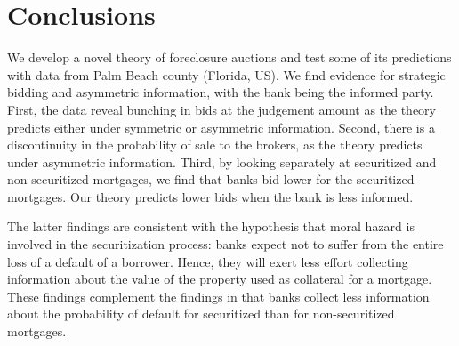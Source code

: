 \documentclass[11pt,twopage]{article}
\begin{document}
%
%
%
%
\section{Conclusions}

We develop a novel theory of foreclosure auctions and test some of its predictions with data from Palm Beach county (Florida, US). We find evidence for strategic bidding and asymmetric information, with the bank being the informed party. First, the data reveal bunching in bids at the judgement amount as the theory predicts either under symmetric or asymmetric information. Second, there is a discontinuity in the probability of sale to the brokers, as the theory predicts under asymmetric information. Third, by looking separately at securitized and non-securitized mortgages, we find that banks bid lower for the securitized mortgages. Our theory predicts lower bids when the bank is less informed.

The latter findings are consistent with the hypothesis that moral hazard is involved in the securitization process: banks expect not to suffer from the entire loss of a default of a borrower. Hence, they will exert less effort collecting information about the value of the property used as collateral for a mortgage. These findings complement the findings in \cite{keys2008did} that banks collect less information about the probability of default for securitized than for non-securitized mortgages.
\end{document}
